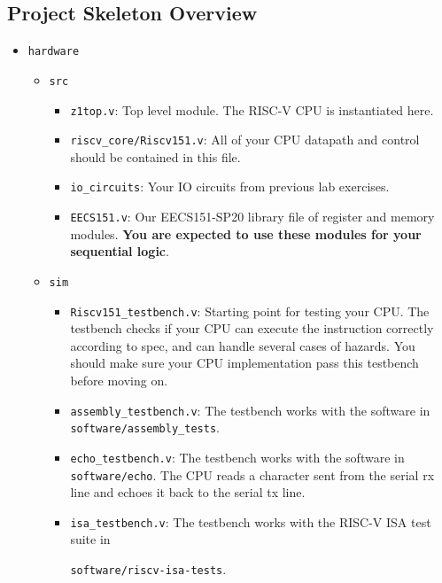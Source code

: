 \documentclass[11pt]{article}
\begin{document}
\subsection{Project Skeleton Overview}
\begin{itemize}
  \item \texttt{hardware}
    \begin{itemize}
      \item \texttt{src}
        \begin{itemize}
          \item \texttt{z1top.v}: Top level module. The RISC-V CPU is instantiated here.
          \item \texttt{riscv\_core/Riscv151.v}: All of your CPU datapath and control should be contained in this file.
          \item \texttt{io\_circuits}: Your IO circuits from previous lab exercises.
          \item \texttt{EECS151.v}: Our EECS151-SP20 library file of register and memory modules. \textbf{You are expected to use these modules for your sequential logic}.
        \end{itemize}
      \item \texttt{sim}
        \begin{itemize}
          \item \verb|Riscv151_testbench.v|: Starting point for testing your CPU. The testbench checks if your CPU can execute the instruction correctly according to spec, and can handle several cases of hazards. You should make sure your CPU implementation pass this testbench before moving on.
          \item \verb|assembly_testbench.v|: The testbench works with the software in \texttt{software/assembly\_tests}.
          \item \verb|echo_testbench.v|: The testbench works with the software in \texttt{software/echo}. The CPU reads a character sent from the serial rx line and echoes it back to the serial tx line.
          \item \verb|isa_testbench.v|: The testbench works with the RISC-V ISA test suite in

\texttt{software/riscv-isa-tests}.


\end{itemize}
\end{itemize}
\end{itemize}
\end{document}
